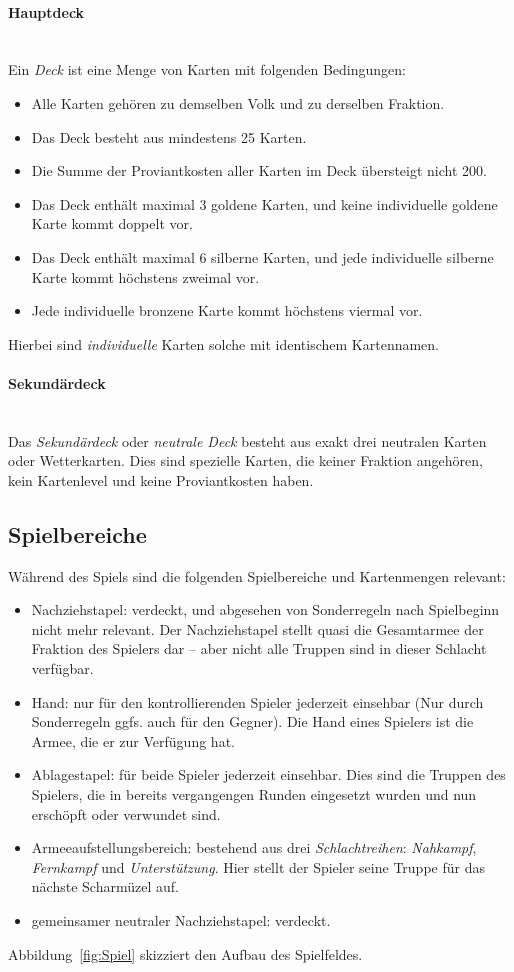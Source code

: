 \documentclass[a4paper,11pt]{report}
\newcommand{\fref}[1]{Abbildung~\ref{#1}}
\begin{document}
\paragraph{Hauptdeck}~\\
Ein \emph{Deck} ist eine Menge von Karten mit folgenden Bedingungen:
\begin{itemize}
	\item Alle Karten gehören zu demselben Volk und zu derselben Fraktion.
	\item Das Deck besteht aus mindestens 25 Karten.
	\item Die Summe der Proviantkosten aller Karten im Deck übersteigt nicht 200.
	\item Das Deck enthält maximal 3 goldene Karten, und keine individuelle goldene Karte kommt doppelt vor.
    \item Das Deck enthält maximal 6 silberne Karten, und jede individuelle silberne Karte kommt höchstens zweimal vor.
    \item Jede individuelle bronzene Karte kommt höchstens viermal vor.
\end{itemize}
Hierbei sind \emph{individuelle} Karten solche mit identischem Kartennamen.

\paragraph{Sekundärdeck}~\\
Das \emph{Sekundärdeck} oder \emph{neutrale Deck} besteht aus exakt drei neutralen Karten oder Wetterkarten. Dies sind spezielle Karten, die keiner Fraktion angehören, kein Kartenlevel und keine Proviantkosten haben. %

\subsection{Spielbereiche}\label{ssec:Bereiche}
Während des Spiels sind die folgenden Spielbereiche und Kartenmengen relevant:
\begin{itemize}
	\item Nachziehstapel: verdeckt, und abgesehen von Sonderregeln nach Spielbeginn nicht mehr relevant. Der Nachziehstapel stellt quasi die Gesamtarmee der Fraktion des Spielers dar -- aber nicht alle Truppen sind in dieser Schlacht verfügbar.
	\item Hand: nur für den kontrollierenden Spieler jederzeit einsehbar (Nur durch Sonderregeln ggfs. auch für den Gegner). Die Hand eines Spielers ist die Armee, die er zur Verfügung hat.
	\item Ablagestapel: für beide Spieler jederzeit einsehbar. Dies sind die Truppen des Spielers, die in bereits vergangengen Runden eingesetzt wurden und nun erschöpft oder verwundet sind.
	\item Armeeaufstellungsbereich: bestehend aus drei \emph{Schlachtreihen}: \emph{Nahkampf}, \emph{Fernkampf} und \emph{Unterstützung}. Hier stellt der Spieler seine Truppe für das nächste Scharmüzel auf.
	\item gemeinsamer neutraler Nachziehstapel: verdeckt.
\end{itemize}
\fref{fig:Spiel} skizziert den Aufbau des Spielfeldes.
\end{document}
